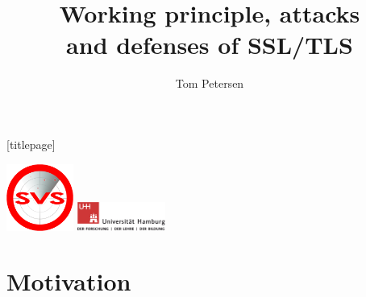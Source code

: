 


\title{Working principle, attacks\\ and defenses of SSL/TLS}
\author[Tom Petersen]{Tom Petersen}
\date{}%



\begingroup
	[titlepage]
	\begin{frame}[plain]
		\vskip8mm
		\includegraphics[width=2.2cm]{pic/svs_logo_hires-ohne-was.png}
		 \vskip-20mm %
		\titlepage
		\vspace{\fill}
		\includegraphics[width=2.9cm]{pic/UHH-Logo_2010_Farbe_RGB_hires_nomargin.png}
		\vskip20pt
	\end{frame}
\endgroup


\section{Motivation}

